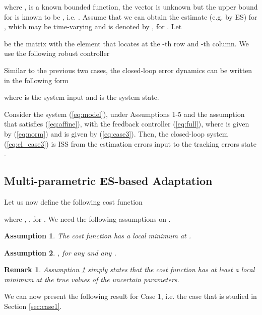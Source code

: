 \documentclass[twoside,leqno,onecolumn]{article}
\newtheorem{assumption}{Assumption}
\newtheorem{remark}{Remark}
\begin{document}
where ,  is a known
bounded function, the vector  is unknown but the upper
bound for  is known to be , i.e.
. Assume that we can obtain the estimate
(e.g. by ES) for , which may be time-varying and is
denoted by , for . Let

be the matrix with the element  that locates at the -th row and -th column.
We use the following robust controller

Similar to the previous two cases, the closed-loop error dynamics
can be written in the following form

where  is the system input and  is the system
state.






\begin{theorem}
\label{thm:case3} Consider the system (\ref{eq:model}), under
Assumptions 1-5 and the assumption that 
satisfies (\ref{eq:affine}), with the feedback controller
(\ref{eq:full}), where  is given by (\ref{eq:norm}) and 
is given by (\ref{eq:case3}). Then, the closed-loop system
(\ref{eq:cl_case3}) is ISS from the estimation errors input
 to the tracking errors
state .
\end{theorem}


\subsection{Multi-parametric ES-based Adaptation} \label{sec:ES}


Let us now define the following cost function

where , ,  for . We need the
following assumptions on .

\begin{assumption}
\label{asp:cost} The cost function  has a local minimum at
.
\end{assumption}

\begin{assumption}
\label{asp:Lips} , for any  and any
.
\end{assumption}

\begin{remark}
Assumption \ref{asp:cost} simply states that the cost function 
has at least a local minimum at the true values of the uncertain
parameters.
\end{remark}

We can now present the following result for Case 1, i.e. the case
that is studied in Section \ref{sec:case1}.
\end{document}
